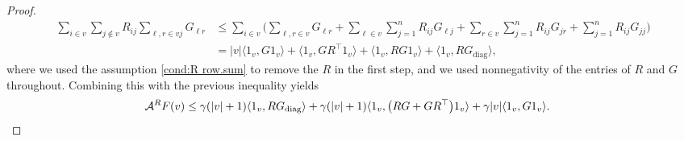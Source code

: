 \documentclass[10pt,a4paper]{amsart}
\def\A{{\mathcal A}}
\begin{document}
\begin{proof}
		\begin{align*}
			\sum_{i\in v}\sum_{j\notin v} R_{ij} \sum_{\ell, r\in vj} G_{\ell r} 
			&\le \sum_{i\in v} \bigg( \sum_{\ell,r\in v} G_{\ell r} + \sum_{\ell\in v} \sum_{j=1}^n R_{ij}G_{\ell j} + \sum_{r\in v} \sum_{j=1}^nR_{ij}G_{j r} + \sum_{j=1}^nR_{ij}G_{j j} \bigg) \\
			&=  |v| \langle 1_v, G 1_v \rangle + \langle 1_v, GR^\top 1_v\rangle  + \langle 1_v, R G 1_v \rangle + \langle 1_v,R G_{\mathrm{diag}}\rangle,
		\end{align*}
		where we used the assumption  \eqref{cond:R row.sum} to remove the $R$ in the first step, and we used nonnegativity of the entries of $R$ and $G$ throughout. 
		Combining this with the previous inequality yields
		\begin{align*}
			\A^{R} F(v) &\le \gamma(|v|+ 1) \langle 1_v,R G_{\mathrm{diag}}\rangle + \gamma (|v|+ 1) \langle 1_v , \big( R G +GR^\top \big) 1_v\rangle + \gamma|v| \langle 1_v, G 1_v \rangle. \qedhere
		\end{align*} 	 
\end{proof}
\end{document}
